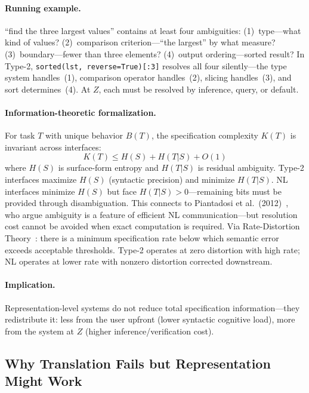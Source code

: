 \documentclass{article}
\theoremstyle{definition}
\begin{document}
\paragraph{Running example.}
``find the three largest values'' contains at least four ambiguities: (1)~type---what kind of values? (2)~comparison criterion---``the largest'' by what measure? (3)~boundary---fewer than three elements? (4)~output ordering---sorted result? In Type-2, \texttt{sorted(lst, reverse=True)[:3]} resolves all four silently---the type system handles~(1), comparison operator handles~(2), slicing handles~(3), and sort determines~(4). At $Z$, each must be resolved by inference, query, or default.

\paragraph{Information-theoretic formalization.}
For task $T$ with unique behavior $B(T)$, the specification complexity $K(T)$ is invariant across interfaces:
\begin{equation}\label{eq:conservation}
K(T) \leq H(S) + H(T|S) + O(1)
\end{equation}
where $H(S)$ is surface-form entropy and $H(T|S)$ is residual ambiguity. Type-2 interfaces maximize $H(S)$ (syntactic precision) and minimize $H(T|S)$. NL interfaces minimize $H(S)$ but face $H(T|S) > 0$---remaining bits must be provided through disambiguation. This connects to Piantadosi et al.\ (2012)~\citep{piantadosi2012ambiguity}, who argue ambiguity is a feature of efficient NL communication---but resolution cost cannot be avoided when exact computation is required. Via Rate-Distortion Theory~\citep{shannon1959coding}: there is a minimum specification rate below which semantic error exceeds acceptable thresholds. Type-2 operates at zero distortion with high rate; NL operates at lower rate with nonzero distortion corrected downstream.

\paragraph{Implication.}
Representation-level systems do not reduce total specification information---they redistribute it: less from the user upfront (lower syntactic cognitive load), more from the system at $Z$ (higher inference/verification cost).

\subsection{Why Translation Fails but Representation Might Work}
\end{document}
